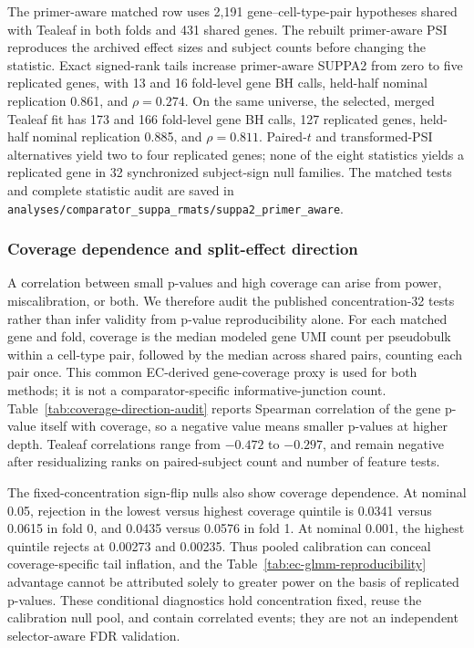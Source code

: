 \documentclass[11pt]{article}
\begin{document}
The primer-aware matched row uses 2,191 gene--cell-type-pair hypotheses shared with Tealeaf in both folds and 431 shared genes. The rebuilt primer-aware PSI reproduces the archived effect sizes and subject counts before changing the statistic. Exact signed-rank tails increase primer-aware SUPPA2 from zero to five replicated genes, with 13 and 16 fold-level gene BH calls, held-half nominal replication 0.861, and \(\rho=0.274\). On the same universe, the selected, merged Tealeaf fit has 173 and 166 fold-level gene BH calls, 127 replicated genes, held-half nominal replication 0.885, and \(\rho=0.811\). Paired-\(t\) and transformed-PSI alternatives yield two to four replicated genes; none of the eight statistics yields a replicated gene in 32 synchronized subject-sign null families. The matched tests and complete statistic audit are saved in \texttt{analyses/comparator\_suppa\_rmats/suppa2\_primer\_aware}.

\subsubsection*{Coverage dependence and split-effect direction}

A correlation between small p-values and high coverage can arise from power, miscalibration, or both. We therefore audit the published concentration-32 tests rather than infer validity from p-value reproducibility alone. For each matched gene and fold, coverage is the median modeled gene UMI count per pseudobulk within a cell-type pair, followed by the median across shared pairs, counting each pair once. This common EC-derived gene-coverage proxy is used for both methods; it is not a comparator-specific informative-junction count. Table~\ref{tab:coverage-direction-audit} reports Spearman correlation of the gene p-value itself with coverage, so a negative value means smaller p-values at higher depth. Tealeaf correlations range from \(-0.472\) to \(-0.297\), and remain negative after residualizing ranks on paired-subject count and number of feature tests.

The fixed-concentration sign-flip nulls also show coverage dependence. At nominal 0.05, rejection in the lowest versus highest coverage quintile is 0.0341 versus 0.0615 in fold 0, and 0.0435 versus 0.0576 in fold 1. At nominal 0.001, the highest quintile rejects at 0.00273 and 0.00235. Thus pooled calibration can conceal coverage-specific tail inflation, and the Table~\ref{tab:ec-glmm-reproducibility} advantage cannot be attributed solely to greater power on the basis of replicated p-values. These conditional diagnostics hold concentration fixed, reuse the calibration null pool, and contain correlated events; they are not an independent selector-aware FDR validation.
\end{document}
